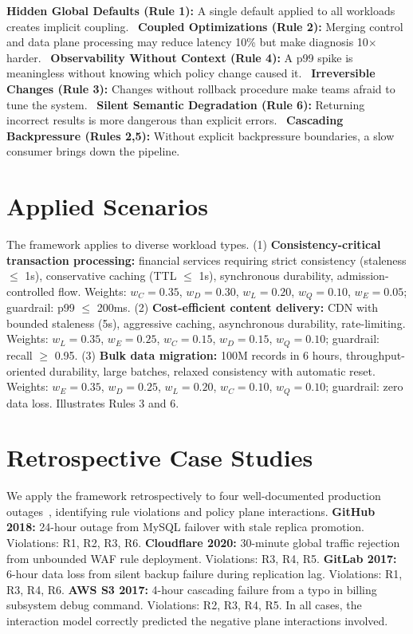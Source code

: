 \documentclass[conference]{IEEEtran}
\begin{document}
\noindent\textbf{Hidden Global Defaults (Rule 1):} A single default applied to all workloads creates implicit coupling.~\newline
\textbf{Coupled Optimizations (Rule 2):} Merging control and data plane processing may reduce latency 10\% but make diagnosis 10$\times$ harder.~\newline
\textbf{Observability Without Context (Rule 4):} A p99 spike is meaningless without knowing which policy change caused it.~\newline
\textbf{Irreversible Changes (Rule 3):} Changes without rollback procedure make teams afraid to tune the system.~\newline
\textbf{Silent Semantic Degradation (Rule 6):} Returning incorrect results is more dangerous than explicit errors.~\newline
\textbf{Cascading Backpressure (Rules 2,5):} Without explicit backpressure boundaries, a slow consumer brings down the pipeline.

\section{Applied Scenarios}
\label{sec:scenarios}
The framework applies to diverse workload types. (1) \textbf{Consistency-critical transaction processing:} financial services requiring strict consistency (staleness $\leq$ 1s), conservative caching (TTL $\leq$ 1s), synchronous durability, admission-controlled flow. Weights: $w_C=0.35$, $w_D=0.30$, $w_L=0.20$, $w_Q=0.10$, $w_E=0.05$; guardrail: p99 $\leq$ 200ms. (2) \textbf{Cost-efficient content delivery:} CDN with bounded staleness (5s), aggressive caching, asynchronous durability, rate-limiting. Weights: $w_L=0.35$, $w_E=0.25$, $w_C=0.15$, $w_D=0.15$, $w_Q=0.10$; guardrail: recall $\geq$ 0.95. (3) \textbf{Bulk data migration:} 100M records in 6 hours, throughput-oriented durability, large batches, relaxed consistency with automatic reset. Weights: $w_E=0.35$, $w_D=0.25$, $w_L=0.20$, $w_C=0.10$, $w_Q=0.10$; guardrail: zero data loss. Illustrates Rules 3 and 6.

\section{Retrospective Case Studies}
\label{sec:cases}

We apply the framework retrospectively to four well-documented production outages~\cite{github2018,cloudflare2020,gitlab2017,aws2017}, identifying rule violations and policy plane interactions. \textbf{GitHub 2018:} 24-hour outage from MySQL failover with stale replica promotion. Violations: R1, R2, R3, R6. \textbf{Cloudflare 2020:} 30-minute global traffic rejection from unbounded WAF rule deployment. Violations: R3, R4, R5. \textbf{GitLab 2017:} 6-hour data loss from silent backup failure during replication lag. Violations: R1, R3, R4, R6. \textbf{AWS S3 2017:} 4-hour cascading failure from a typo in billing subsystem debug command. Violations: R2, R3, R4, R5. In all cases, the interaction model correctly predicted the negative plane interactions involved.
\end{document}

